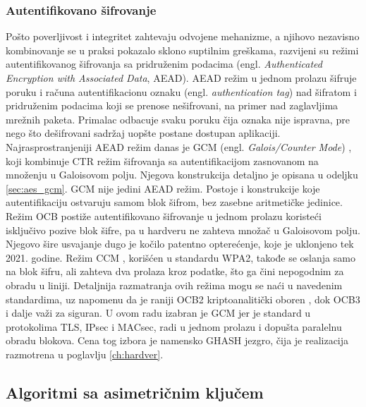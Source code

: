 \subsubsection{Autentifikovano šifrovanje}
\label{subsubsec:aead}

Pošto poverljivost i integritet zahtevaju odvojene mehanizme, a njihovo nezavisno kombinovanje se u praksi pokazalo sklono suptilnim greškama, razvijeni su režimi autentifikovanog šifrovanja sa pridruženim podacima (engl. \textit{Authenticated Encryption with Associated Data}, AEAD). AEAD režim u jednom prolazu šifruje poruku i računa autentifikacionu oznaku (engl. \textit{authentication tag}) nad šifratom i pridruženim podacima koji se prenose nešifrovani, na primer nad zaglavljima mrežnih paketa. Primalac odbacuje svaku poruku čija oznaka nije ispravna, pre nego što dešifrovani sadržaj uopšte postane dostupan aplikaciji. Najrasprostranjeniji AEAD režim danas je GCM (engl. \textit{Galois/Counter Mode}) \cite{sp80038d}, koji kombinuje CTR režim šifrovanja sa autentifikacijom zasnovanom na množenju u Galoisovom polju. Njegova konstrukcija detaljno je opisana u odeljku \ref{sec:aes_gcm}.
\smallbreak
GCM nije jedini AEAD režim. Postoje i konstrukcije koje autentifikaciju ostvaruju samom blok šifrom, bez zasebne aritmetičke jedinice. Režim OCB \cite{rfc7253} postiže autentifikovano šifrovanje u jednom prolazu koristeći isključivo pozive blok šifre, pa u hardveru ne zahteva množač u Galoisovom polju. Njegovo šire usvajanje dugo je kočilo patentno opterećenje, koje je uklonjeno tek 2021. godine. Režim CCM \cite{sp80038c}, korišćen u standardu WPA2, takođe se oslanja samo na blok šifru, ali zahteva dva prolaza kroz podatke, što ga čini nepogodnim za obradu u liniji. Detaljnija razmatranja ovih režima mogu se naći u navedenim standardima, uz napomenu da je raniji OCB2 kriptoanalitički oboren \cite{inoue_ocb2}, dok OCB3 i dalje važi za siguran. U ovom radu izabran je GCM jer je standard u protokolima TLS, IPsec i MACsec, radi u jednom prolazu i dopušta paralelnu obradu blokova. Cena tog izbora je namensko GHASH jezgro, čija je realizacija razmotrena u poglavlju \ref{ch:hardver}.

\subsection{Algoritmi sa asimetričnim ključem}
\label{subsec:asimetricni}

